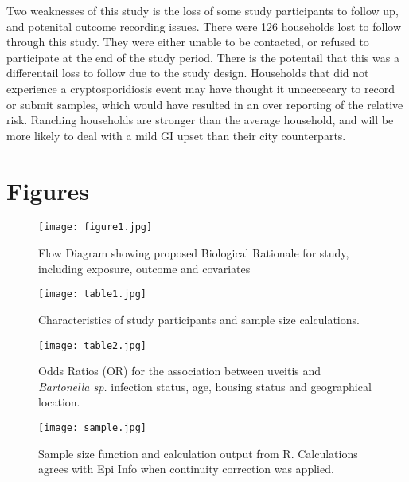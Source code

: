 \documentclass[12pt]{article}
\begin{document}
		Two weaknesses of this study is the loss of some study participants to follow up, and potenital outcome recording issues.
		There were 126 households lost to follow through this study. They were either unable to be contacted, or refused to participate at the end of the study period. There is the potentail that this was a differentail loss to follow due to the study design. 
		Households that did not experience a cryptosporidiosis event may have thought it unneccecary to record or submit samples, which would have resulted in an over reporting of the relative risk.
		Ranching households are stronger than the average household, and will be more likely to deal with a mild GI upset than their city counterparts. 
		\clearpage
		
	\section{Figures}

\begin{figure*}[h!]
	\centering
	\texttt{[image: figure1.jpg]}
	\caption{Flow Diagram showing proposed Biological Rationale for study, including exposure, outcome and covariates }
	\label{fig:1}
\end{figure*}

\begin{figure*}[h!]
	\centering
	\texttt{[image: table1.jpg]}
	\caption{Characteristics of study participants and sample size calculations.}
	\label{tab:1}
\end{figure*}
 
\begin{figure*}[h!]
	\centering
	\texttt{[image: table2.jpg]}
	\caption{Odds Ratios (OR) for the association between uveitis and \emph{Bartonella sp.} infection status, age, housing status and geographical location.}
	\label{tab:2}
\end{figure*}

\begin{figure*}[h!]
	\centering
	\texttt{[image: sample.jpg]}
	\caption{Sample size function and calculation output from R. Calculations agrees with Epi Info when continuity correction was applied.}
	\label{fig:samplesizecalc}
\end{figure*}

\clearpage


\end{document}

